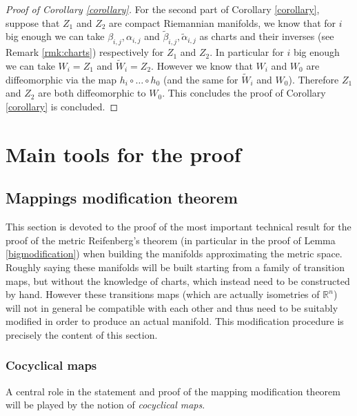 \documentclass[11pt]{article}
\newcommand{\rr}{\mathbb{R}}
\theoremstyle{plain}
\theoremstyle{definition}
\numberwithin{equation}{section}
\begin{document}
\begin{proof}[Proof of Corollary \ref{corollary}]
For the second part of Corollary \ref{corollary}, suppose that $Z_1$ and $Z_2$ are compact Riemannian manifolds, we know that for $i$ big enough we can take $\beta_{i,j},\alpha_{i,j}$ and $\tilde \beta_{i,j}, \tilde \alpha_{i,j}$ as charts and their inverses (see Remark \ref{rmk:charts}) respectively for $Z_1$ and $Z_2$. In particular for $i$ big enough we can take $W_i=Z_1$ and $\tilde W_i=Z_2$. However we know that $W_i$ and $W_0$ are diffeomorphic via the map $h_i\circ \dots\circ h_0$ (and the same for $\tilde W_i$ and $W_0$). Therefore $Z_1$ and $Z_2$ are both diffeomorphic to $W_0$. This concludes the proof of Corollary \ref{corollary} is concluded.
\end{proof}

\section{Main tools for the proof}



\subsection{Mappings modification theorem}\label{sec:modification}
This section is devoted to the proof of the most important technical result for the proof of the metric Reifenberg's theorem (in particular in the proof of Lemma \ref{bigmodification}) when building the manifolds approximating the metric space. Roughly saying these manifolds will be built starting from a  family of transition maps, but without the knowledge of charts, which instead need to be constructed by hand. However these transitions maps (which are actually isometries of $\rr^n$) will  not  in general be compatible with each other  and thus need to be suitably modified in order to produce an actual manifold. This modification procedure is precisely the content of this section. 





\subsubsection{Cocyclical maps}\label{sec:cocyclical}
A central role in the statement and proof of the mapping modification theorem will be played by the notion of \textit{cocyclical maps}.
\end{document}
